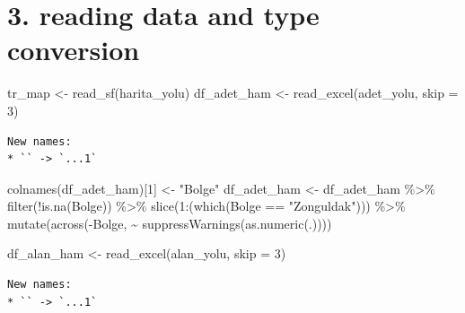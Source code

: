 \documentclass[
  11pt,
  a4paper,
  DIV=11,
  numbers=noendperiod]{scrartcl}
\newenvironment{Shaded}{\begin{snugshade}}{\end{snugshade}}
\newcommand{\AttributeTok}[1]{\textcolor[rgb]{0.40,0.45,0.13}{#1}}
\newcommand{\DecValTok}[1]{\textcolor[rgb]{0.68,0.00,0.00}{#1}}
\newcommand{\FunctionTok}[1]{\textcolor[rgb]{0.28,0.35,0.67}{#1}}
\newcommand{\NormalTok}[1]{\textcolor[rgb]{0.00,0.23,0.31}{#1}}
\newcommand{\OtherTok}[1]{\textcolor[rgb]{0.00,0.23,0.31}{#1}}
\newcommand{\SpecialCharTok}[1]{\textcolor[rgb]{0.37,0.37,0.37}{#1}}
\newcommand{\StringTok}[1]{\textcolor[rgb]{0.13,0.47,0.30}{#1}}
\begin{document}
\section{3. reading data and type
conversion}\label{reading-data-and-type-conversion}

\begin{Shaded}
\begin{Highlighting}[]
\NormalTok{tr\_map }\OtherTok{\textless{}{-}} \FunctionTok{read\_sf}\NormalTok{(harita\_yolu)}
\NormalTok{df\_adet\_ham }\OtherTok{\textless{}{-}} \FunctionTok{read\_excel}\NormalTok{(adet\_yolu, }\AttributeTok{skip =} \DecValTok{3}\NormalTok{)}
\end{Highlighting}
\end{Shaded}

\begin{verbatim}
New names:
* `` -> `...1`
\end{verbatim}

\begin{Shaded}
\begin{Highlighting}[]
\FunctionTok{colnames}\NormalTok{(df\_adet\_ham)[}\DecValTok{1}\NormalTok{] }\OtherTok{\textless{}{-}} \StringTok{"Bolge"}
\NormalTok{df\_adet\_ham }\OtherTok{\textless{}{-}}\NormalTok{ df\_adet\_ham }\SpecialCharTok{\%\textgreater{}\%} 
  \FunctionTok{filter}\NormalTok{(}\SpecialCharTok{!}\FunctionTok{is.na}\NormalTok{(Bolge)) }\SpecialCharTok{\%\textgreater{}\%} 
  \FunctionTok{slice}\NormalTok{(}\DecValTok{1}\SpecialCharTok{:}\NormalTok{(}\FunctionTok{which}\NormalTok{(Bolge }\SpecialCharTok{==} \StringTok{"Zonguldak"}\NormalTok{))) }\SpecialCharTok{\%\textgreater{}\%}
  \FunctionTok{mutate}\NormalTok{(}\FunctionTok{across}\NormalTok{(}\SpecialCharTok{{-}}\NormalTok{Bolge, }\SpecialCharTok{\textasciitilde{}} \FunctionTok{suppressWarnings}\NormalTok{(}\FunctionTok{as.numeric}\NormalTok{(.))))}

\NormalTok{df\_alan\_ham }\OtherTok{\textless{}{-}} \FunctionTok{read\_excel}\NormalTok{(alan\_yolu, }\AttributeTok{skip =} \DecValTok{3}\NormalTok{)}
\end{Highlighting}
\end{Shaded}

\begin{verbatim}
New names:
* `` -> `...1`
\end{verbatim}
\end{document}
